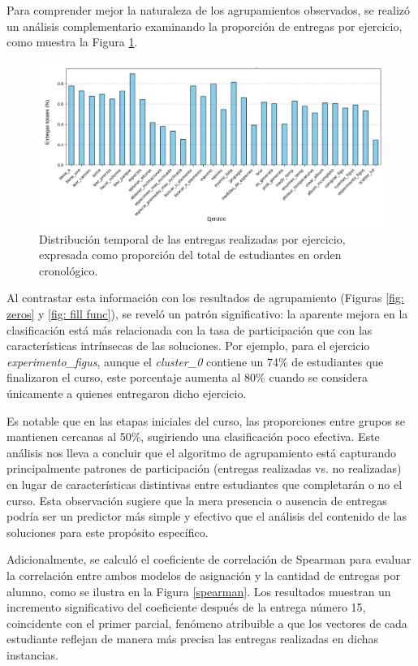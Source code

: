 \documentclass[11pt,a4paper,twoside,openany]{tesis}
\begin{document}
Para comprender mejor la naturaleza de los agrupamientos observados, se realizó un análisis complementario examinando la proporción de entregas por ejercicio, como muestra la Figura \ref{entregas}.

\begin{figure}[H]
    \centering
    \includegraphics[width=\textwidth]{imagenes/proporcion - entregas (1).png}
    \caption{Distribución temporal de las entregas realizadas por ejercicio, expresada como proporción del total de estudiantes en orden cronológico.}
     \label{entregas}
\end{figure}

Al contrastar esta información con los resultados de agrupamiento (Figuras \ref{fig: zeros} y \ref{fig: fill func}), se reveló un patrón significativo: la aparente mejora en la clasificación está más relacionada con la tasa de participación que con las características intrínsecas de las soluciones. Por ejemplo, para el ejercicio \emph{experimento\_figus}, aunque el \emph{cluster\_0} contiene un 74\% de estudiantes que finalizaron el curso, este porcentaje aumenta al 80\% cuando se considera únicamente a quienes entregaron dicho ejercicio.

Es notable que en las etapas iniciales del curso, las proporciones entre grupos se mantienen cercanas al 50\%, sugiriendo una clasificación poco efectiva. Este análisis nos lleva a concluir que el algoritmo de agrupamiento está capturando principalmente patrones de participación (entregas realizadas vs. no realizadas) en lugar de características distintivas entre estudiantes que completarán o no el curso. Esta observación sugiere que la mera presencia o ausencia de entregas podría ser un predictor más simple y efectivo que el análisis del contenido de las soluciones para este propósito específico.

Adicionalmente, se calculó el coeficiente de correlación de Spearman para evaluar la correlación entre ambos modelos de asignación y la cantidad de entregas por alumno, como se ilustra en la Figura \ref{spearman}. Los resultados muestran un incremento significativo del coeficiente después de la entrega número 15, coincidente con el primer parcial, fenómeno atribuible a que los vectores de cada estudiante reflejan de manera más precisa las entregas realizadas en dichas instancias.
\end{document}
